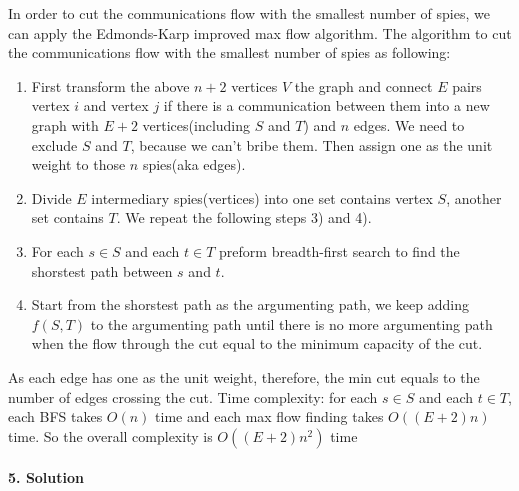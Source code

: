 \documentclass[a4paper]{scrartcl}
\begin{document}
\begin{enumerate}[label=(\alph{*})]
  In order to cut the communications flow with the smallest number of spies, we can apply the Edmonds-Karp improved max flow algorithm. The algorithm to cut the communications flow with
  the smallest number of spies as following:
  \begin{enumerate}[label=\arabic{*})]
    \item First transform the above $n+2$ vertices $V$ the graph and connect $E$ pairs vertex $i$ and vertex $j$ if there is a communication between them into a new graph with $E+2$ vertices(including $S$ and $T$) and $n$ edges. We need to exclude $S$ and $T$, because we can't bribe them. Then assign one as the unit weight to those $n$ spies(aka edges).
    \item Divide $E$ intermediary spies(vertices) into one set contains vertex $S$, another set contains $T$. We repeat the following steps 3) and 4).
    \item For each $s \in S$ and each $t \in T$ preform breadth-first search to find the shorstest path between $s$ and $t$.
    \item Start from the shorstest path as the argumenting path, we keep adding $f(S,T)$ to the argumenting path until there is no more argumenting path when the flow through the cut equal to the minimum capacity of the cut.
  \end{enumerate}
  As each edge has one as the unit weight, therefore, the min cut equals to the number of edges crossing the cut.
   Time complexity: for each $s \in S$ and each $t \in T$, each BFS takes $O(n)$ time and each max flow finding takes $O((E+2)n)$ time. So the overall complexity is $O((E+2)n^2  )$ time
  \end{enumerate}
\paragraph{5. Solution}
\label{sec:Question 5}
\end{document}
